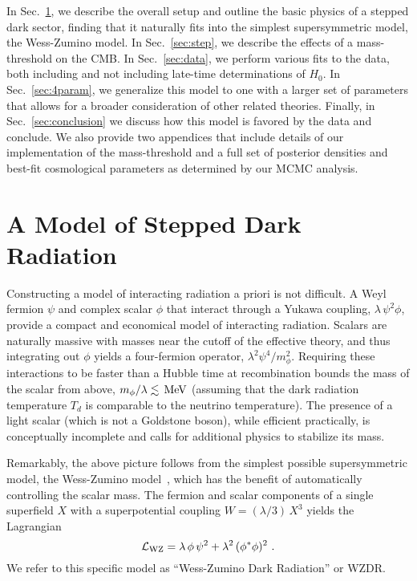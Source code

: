 \documentclass[aps,prd,twocolumn,nofootinbib,superscriptaddress]{revtex4}
\newcommand{\Sec}[1]{Sec.~\ref{sec:#1}}
\newcommand{\be}{\begin{equation}}
\newcommand{\ee}{\end{equation}}
\def\MeV{\,{\rm MeV}}
\begin{document}
In \Sec{model}, we describe the overall setup and outline the basic physics of a stepped dark sector, finding that it naturally fits into the simplest supersymmetric model, the Wess-Zumino model. In \Sec{step}, we describe the effects of a mass-threshold on the CMB. In \Sec{data}, we perform various fits to the data, both including and not including late-time determinations of $H_0$.  In \Sec{4param}, we generalize this model to one with a larger set of parameters that allows for a broader consideration of other related theories. Finally, in  \Sec{conclusion} we discuss how this model is favored by the data and conclude. We also provide two appendices that include details of our implementation of the mass-threshold and a full set of posterior densities and best-fit cosmological parameters as determined by our MCMC analysis.


\section{A Model of Stepped Dark Radiation}
\label{sec:model}

Constructing a model of interacting radiation a priori is not difficult. A Weyl fermion $\psi$ and complex scalar $\phi$ that interact through a Yukawa coupling, $\lambda \,  \psi^2 \phi$, provide a compact and economical model of interacting radiation. Scalars are naturally massive with masses near the cutoff of the effective theory, and thus integrating out $\phi$ yields a four-fermion operator, $\lambda^2 \psi^4 / m_\phi^2$. Requiring these interactions to be faster than a Hubble time at recombination bounds the mass of the scalar from above, $m_\phi/\lambda \lesssim \MeV$ (assuming that the dark radiation temperature $T_d$ is comparable to the neutrino temperature). The presence of a light scalar (which is not a Goldstone boson), while efficient practically, is conceptually incomplete and calls for additional physics to stabilize its mass.

Remarkably, the above picture follows from the simplest possible supersymmetric model, the Wess-Zumino model~\cite{Wess:1974tw}, which has the benefit of automatically controlling the scalar mass. The fermion and scalar components of a single superfield $X$ with a superpotential coupling $W= (\lambda / 3) \, X^3$ yields the Lagrangian
\be
{\cal L}_\text{WZ} =  \lambda \, \phi \, \psi^2 + \lambda^2 \, (\phi^* \phi)^2
~.
\ee
We refer to this specific model as ``Wess-Zumino Dark Radiation'' or WZDR. 
\end{document}
